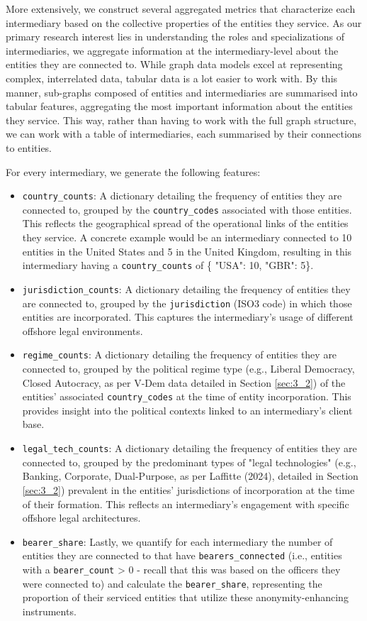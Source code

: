 More extensively, we construct several aggregated metrics that characterize each intermediary based on the collective properties of the entities they service. As our primary research interest lies in understanding the roles and specializations of intermediaries, we aggregate information at the intermediary-level about the entities they are connected to. While graph data models excel at representing complex, interrelated data, tabular data is a lot easier to work with. By this manner, sub-graphs composed of entities and intermediaries are summarised into tabular features, aggregating the most important information about the entities they service. This way, rather than having to work with the full graph structure, we can work with a table of intermediaries, each summarised by their connections to entities. 

For every intermediary, we generate the following features:

\begin{itemize}
   \item \texttt{country\_counts}: A dictionary detailing the frequency of entities they are connected to, grouped by the \texttt{country\_codes} associated with those entities. This reflects the geographical spread of the operational links of the entities they service. A concrete example would be an intermediary connected to 10 entities in the United States and 5 in the United Kingdom, resulting in this intermediary having a \texttt{country\_counts} of \{ "USA": 10, "GBR": 5\}. 
   \item \texttt{jurisdiction\_counts}: A dictionary detailing the frequency of entities they are connected to, grouped by the \texttt{jurisdiction} (ISO3 code) in which those entities are incorporated. This captures the intermediary's usage of different offshore legal environments.
   \item \texttt{regime\_counts}: A dictionary detailing the frequency of entities they are connected to, grouped by the political regime type (e.g., Liberal Democracy, Closed Autocracy, as per V-Dem data detailed in Section \ref{sec:3_2}) of the entities' associated \texttt{country\_codes} at the time of entity incorporation. This provides insight into the political contexts linked to an intermediary's client base. 
   \item \texttt{legal\_tech\_counts}: A dictionary detailing the frequency of entities they are connected to, grouped by the predominant types of "legal technologies" (e.g., Banking, Corporate, Dual-Purpose, as per Laffitte (2024), detailed in Section \ref{sec:3_2}) prevalent in the entities' jurisdictions of incorporation at the time of their formation. This reflects an intermediary's engagement with specific offshore legal architectures.
   \item \texttt{bearer\_share}: Lastly, we quantify for each intermediary the number of entities they are connected to that have \texttt{bearers\_connected} (i.e., entities with a \texttt{bearer\_count} > 0 - recall that this was based on the officers they were connected to) and calculate the \texttt{bearer\_share}, representing the proportion of their serviced entities that utilize these anonymity-enhancing instruments.
\end{itemize}

